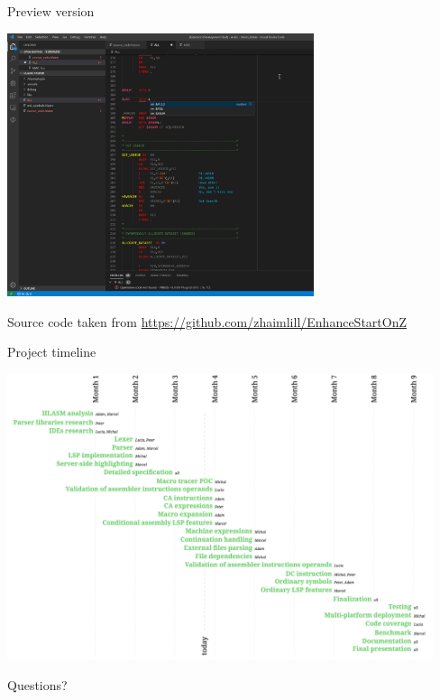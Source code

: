 \documentclass[10pt]{beamer}
\begin{document}
\begin{frame}[fragile]{Preview version}

\centering
\includegraphics[width=9cm]{img/screenshot}

\small
Source code taken from \url{https://github.com/zhaimlill/EnhanceStartOnZ}

\end{frame}


\begin{frame}[fragile]{Project timeline}

\centering
\hspace*{-0.95cm}
\includegraphics[width=12.5cm]{img/timeline}

\end{frame}


\begin{frame}[standout]
  Questions?
\end{frame}
\end{document}
